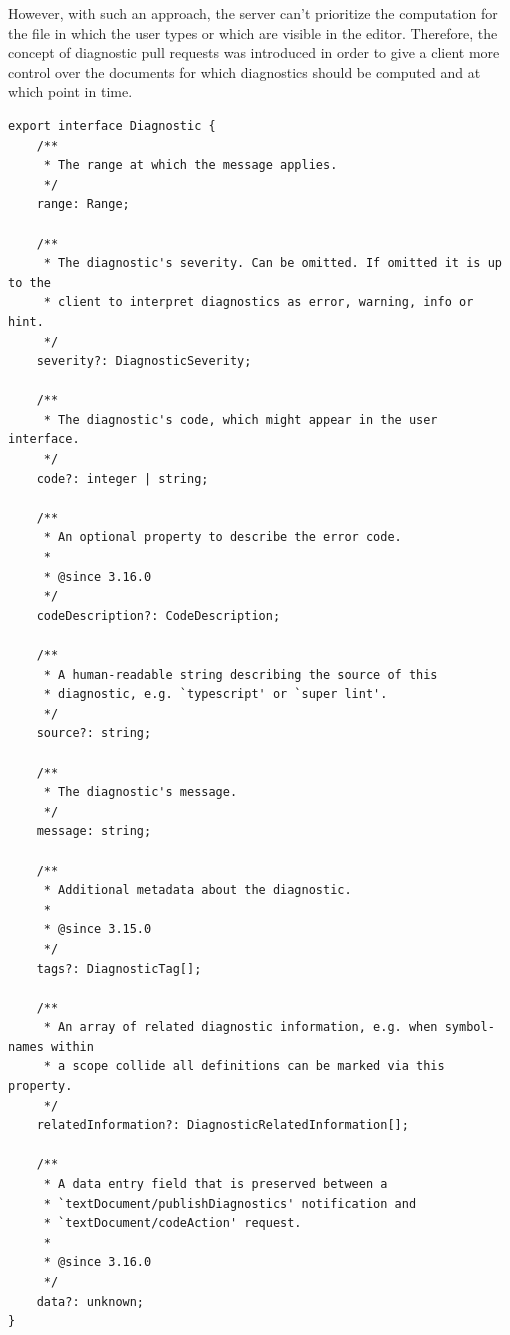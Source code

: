 However, with such an approach, the server can't prioritize the computation for the file in which the user types or which are visible in the editor. Therefore, the concept of diagnostic pull requests was introduced in order to give a client more control over the documents for which diagnostics should be computed and at which point in time.
\begin{lstlisting}[caption={Diagnostic interface \cite{LanguageServerProtocolWebsite}}, label={lst:block_struct}]
export interface Diagnostic {
	/**
	 * The range at which the message applies.
	 */
	range: Range;

	/**
	 * The diagnostic's severity. Can be omitted. If omitted it is up to the
	 * client to interpret diagnostics as error, warning, info or hint.
	 */
	severity?: DiagnosticSeverity;

	/**
	 * The diagnostic's code, which might appear in the user interface.
	 */
	code?: integer | string;

	/**
	 * An optional property to describe the error code.
	 *
	 * @since 3.16.0
	 */
	codeDescription?: CodeDescription;

	/**
	 * A human-readable string describing the source of this
	 * diagnostic, e.g. `typescript' or `super lint'.
	 */
	source?: string;

	/**
	 * The diagnostic's message.
	 */
	message: string;

	/**
	 * Additional metadata about the diagnostic.
	 *
	 * @since 3.15.0
	 */
	tags?: DiagnosticTag[];

	/**
	 * An array of related diagnostic information, e.g. when symbol-names within
	 * a scope collide all definitions can be marked via this property.
	 */
	relatedInformation?: DiagnosticRelatedInformation[];

	/**
	 * A data entry field that is preserved between a
	 * `textDocument/publishDiagnostics' notification and
	 * `textDocument/codeAction' request.
	 *
	 * @since 3.16.0
	 */
	data?: unknown;
}
\end{lstlisting}
